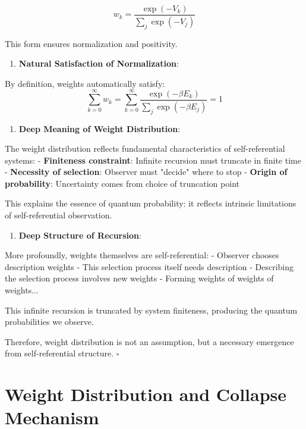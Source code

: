 \begin{equation}
w_k = \frac{\exp(-V_k)}{\sum_{j} \exp(-V_j)}
\end{equation}
   
   This form ensures normalization and positivity.

\begin{enumerate}
\item \textbf{Natural Satisfaction of Normalization}:
\end{enumerate}
   
   By definition, weights automatically satisfy:
\begin{equation}
\sum_{k=0}^{\infty} w_k = \sum_{k=0}^{\infty} \frac{\exp(-\beta E_k)}{\sum_{j} \exp(-\beta E_j)} = 1
\end{equation}

\begin{enumerate}
\item \textbf{Deep Meaning of Weight Distribution}:
\end{enumerate}
   
   The weight distribution reflects fundamental characteristics of self-referential systems:
   - \textbf{Finiteness constraint}: Infinite recursion must truncate in finite time
   - \textbf{Necessity of selection}: Observer must "decide" where to stop
   - \textbf{Origin of probability}: Uncertainty comes from choice of truncation point
   
   This explains the essence of quantum probability: it reflects intrinsic limitations of self-referential observation.

\begin{enumerate}
\item \textbf{Deep Structure of Recursion}:
\end{enumerate}
   
   More profoundly, weights themselves are self-referential:
   - Observer chooses description weights
   - This selection process itself needs description
   - Describing the selection process involves new weights
   - Forming weights of weights of weights...
   
   This infinite recursion is truncated by system finiteness, producing the quantum probabilities we observe.

Therefore, weight distribution is not an assumption, but a necessary emergence from self-referential structure. $\square$

\section{Weight Distribution and Collapse Mechanism}
\label{sec:ch03_quantum:weight-distribution-and-collapse-mechanism}

